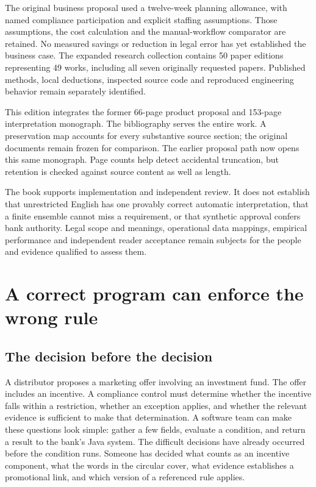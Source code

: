 \documentclass[12pt,a4paper,oneside,openany]{book}
\begin{document}
The original business proposal used a twelve-week planning allowance, with
named compliance participation and explicit staffing assumptions. Those
assumptions, the cost calculation and the manual-workflow comparator are retained.
No measured savings or reduction in legal error has yet established the business
case. The expanded research collection contains 50 paper editions representing
49 works, including all seven originally requested papers. Published methods,
local deductions, inspected source code and reproduced engineering behavior
remain separately identified.

This edition integrates the former 66-page product proposal and 153-page
interpretation monograph. The bibliography serves the entire work. A
preservation map accounts for every substantive source section;
the original documents remain frozen for comparison. The earlier proposal path
now opens this same monograph. Page counts help detect accidental truncation,
but retention is checked against source content as well as length.

The book supports implementation and independent review. It does not establish
that unrestricted English has one provably correct automatic interpretation,
that a finite ensemble cannot miss a requirement, or that synthetic approval
confers bank authority. Legal scope and meanings, operational data mappings,
empirical performance and independent reader acceptance remain subjects for
the people and evidence qualified to assess them.

\tableofcontents
\mainmatter
\chapter{A correct program can enforce the wrong rule}
\label{ch:problem}

\section{The decision before the decision}
\label{merge:M01:00}

\label{sec:problem-decision}
A distributor proposes a marketing offer involving an investment fund. The
offer includes an incentive. A compliance control must determine whether the
incentive falls within a restriction, whether an exception applies, and whether
the relevant evidence is sufficient to make that determination. A software team
can make these questions look simple: gather a few fields, evaluate a condition,
and return a result to the bank's Java system. The difficult decisions have
already occurred before the condition runs. Someone has decided what counts as
an incentive component, what the words in the circular cover, what evidence
establishes a promotional link, and which version of a referenced rule applies.
\end{document}
